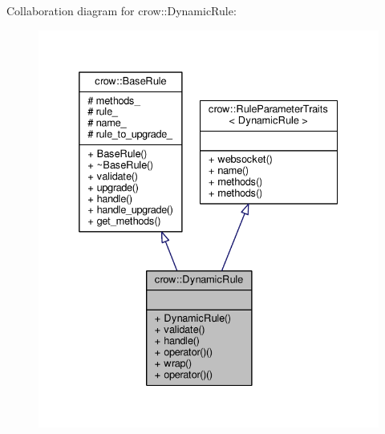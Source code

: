 Collaboration diagram for crow\-:\-:Dynamic\-Rule\-:
\nopagebreak
\begin{figure}[H]
\begin{center}
\leavevmode
\includegraphics[width=332pt]{classcrow_1_1_dynamic_rule__coll__graph}
\end{center}
\end{figure}
